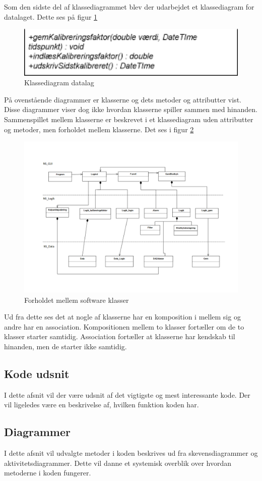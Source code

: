 Som den sidste del af klassediagrammet blev der udarbejdet et klassediagram for datalaget. Dette ses på figur \ref{klassediagramdata}
\begin{figure}[H]
	\includegraphics[width=1\textwidth]{Figurer/Softwareimplementering/UML-klassediagramdata}
	\caption{Klassediagram datalag}
	\label{klassediagramdata}
\end{figure}


På ovenstående diagrammer er klasserne og dets metoder og attributter vist. Disse diagrammer viser dog ikke hvordan klasserne spiller sammen med hinanden. Sammenspillet mellem klasserne er beskrevet i et klassediagram uden attributter og metoder, men forholdet mellem klasserne. Det ses i figur \ref{komposition}
\begin{figure}[H]
	\includegraphics[width=1\textwidth]{Figurer/SOftwareimplementering/komposition}
	\caption{Forholdet mellem software klasser}
	\label{komposition}
\end{figure}
Ud fra dette ses det at nogle af klasserne har en komposition i mellem sig og andre har en association. Kompositionen mellem to klasser fortæller om de to klasser starter samtidig. Association fortæller at klasserne har kendskab til hinanden, men de starter ikke samtidig.  




\subsection{Kode udsnit}
I dette afsnit vil der være udsnit af det vigtigste og mest interessante kode. Der vil ligeledes være en beskrivelse af, hvilken funktion koden har.

\subsection{Diagrammer}
I dette afsnit vil udvalgte metoder i koden beskrives ud fra skevensdiagrammer og aktivitetsdiagrammer. Dette vil danne et systemisk overblik over hvordan metoderne i koden fungerer. 

 







